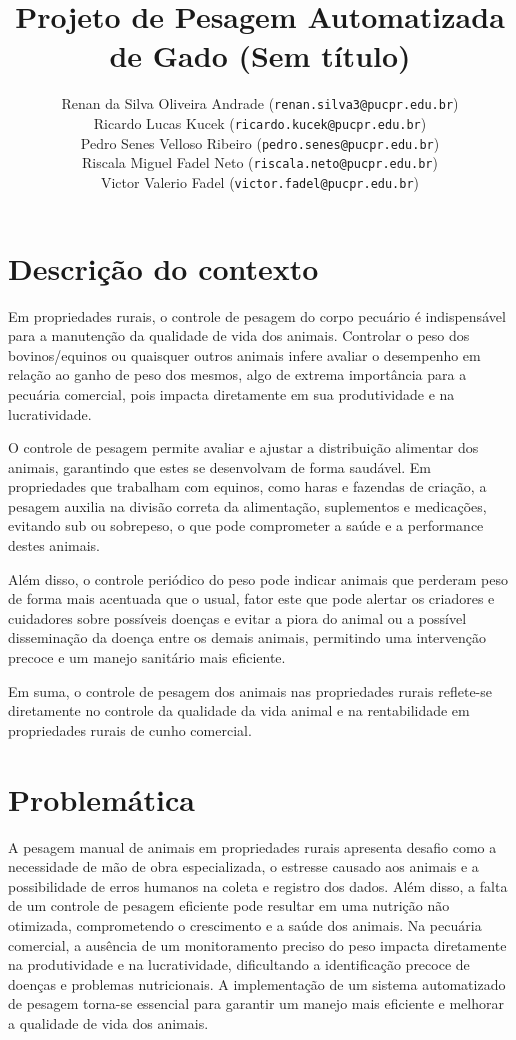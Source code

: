\documentclass[11pt]{article}
\title{\textbf{Projeto de Pesagem Automatizada de Gado (Sem título)}}
\author{
    Renan da Silva Oliveira Andrade (\texttt{renan.silva3@pucpr.edu.br})\\
    Ricardo Lucas Kucek (\texttt{ricardo.kucek@pucpr.edu.br})\\
    Pedro Senes Velloso Ribeiro (\texttt{pedro.senes@pucpr.edu.br})\\ 
    Riscala Miguel Fadel Neto (\texttt{riscala.neto@pucpr.edu.br})\\ Victor Valerio Fadel (\texttt{victor.fadel@pucpr.edu.br})
}
\begin{document}
\maketitle

\section{Descrição do contexto}

Em propriedades rurais, o controle de pesagem do corpo pecuário é indispensável para a manutenção da qualidade de vida dos animais. Controlar o peso dos bovinos/equinos ou quaisquer outros animais infere avaliar o desempenho em relação ao ganho de peso dos mesmos, algo de extrema importância para a pecuária comercial, pois impacta diretamente em sua produtividade e na lucratividade.

O controle de pesagem permite avaliar e ajustar a distribuição alimentar dos animais, garantindo que estes se desenvolvam de forma saudável. Em propriedades que trabalham com equinos, como haras e fazendas de criação, a pesagem auxilia na divisão correta da alimentação, suplementos e medicações, evitando sub ou sobrepeso, o que pode comprometer a saúde e a performance destes animais.

Além disso, o controle periódico do peso pode indicar animais que perderam peso de forma mais acentuada que o usual, fator este que pode alertar os criadores e cuidadores sobre possíveis doenças e evitar a piora do animal ou a possível disseminação da doença entre os demais animais, permitindo uma intervenção precoce e um manejo sanitário mais eficiente.

Em suma, o controle de pesagem dos animais nas propriedades rurais reflete-se diretamente no controle da qualidade da vida animal e na rentabilidade em propriedades rurais de cunho comercial.

\section{Problemática}
A pesagem manual de animais em propriedades rurais apresenta desafio como a necessidade de mão de obra especializada, o estresse causado aos animais e a possibilidade de erros humanos na coleta e registro dos dados. Além disso, a falta de um controle de pesagem eficiente pode resultar em uma nutrição não otimizada, comprometendo o crescimento e a saúde dos animais. Na pecuária comercial, a ausência de um monitoramento preciso do peso impacta diretamente na produtividade e na lucratividade, dificultando a identificação precoce de doenças e problemas nutricionais. A implementação de um sistema automatizado de pesagem torna-se essencial para garantir um manejo mais eficiente e melhorar a qualidade de vida dos animais.
\end{document}
